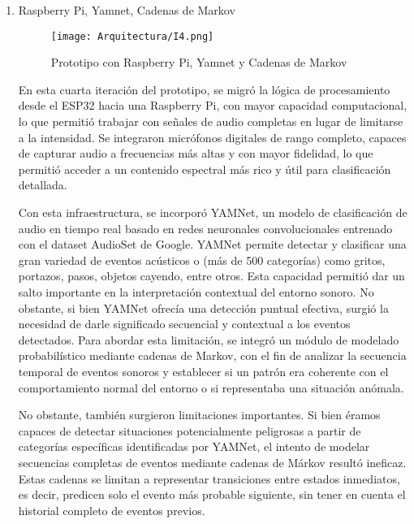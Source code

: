 \begin{enumerate}
      \item Raspberry Pi, Yamnet, Cadenas de Markov

            \begin{figure}[h]
                  \centering
                  \texttt{[image: Arquitectura/I4.png]}
                  \caption{Prototipo con Raspberry Pi, Yamnet y Cadenas de Markov}
                  \label{fig:prototipo4}
            \end{figure}

            En esta cuarta iteración del prototipo, se migró la lógica de procesamiento desde el ESP32 hacia una Raspberry Pi, con mayor capacidad computacional, lo que permitió trabajar con señales de audio completas en lugar de limitarse a la intensidad. Se integraron micrófonos digitales de rango completo, capaces de capturar audio a frecuencias más altas y con mayor fidelidad, lo que permitió acceder a un contenido espectral más rico y útil para clasificación detallada.

            Con esta infraestructura, se incorporó YAMNet, un modelo de clasificación de audio en tiempo real basado en redes neuronales convolucionales entrenado con el dataset AudioSet de Google. YAMNet permite detectar y clasificar una gran variedad de eventos acústicos o (más de 500 categorías) como gritos, portazos, pasos, objetos cayendo, entre otros. Esta capacidad permitió dar un salto importante en la interpretación contextual del entorno sonoro.
            No obstante, si bien YAMNet ofrecía una detección puntual efectiva, surgió la necesidad de darle significado secuencial y contextual a los eventos detectados. Para abordar esta limitación, se integró un módulo de modelado probabilístico mediante cadenas de Markov, con el fin de analizar la secuencia temporal de eventos sonoros y establecer si un patrón era coherente con el comportamiento normal del entorno o si representaba una situación anómala.

            No obstante, también surgieron limitaciones importantes. Si bien éramos capaces de detectar situaciones potencialmente peligrosas a partir de categorías específicas identificadas por YAMNet, el intento de modelar secuencias completas de eventos mediante cadenas de Márkov resultó ineficaz. Estas cadenas se limitan a representar transiciones entre estados inmediatos, es decir, predicen solo el evento más probable siguiente, sin tener en cuenta el historial completo de eventos previos.


\end{enumerate}
